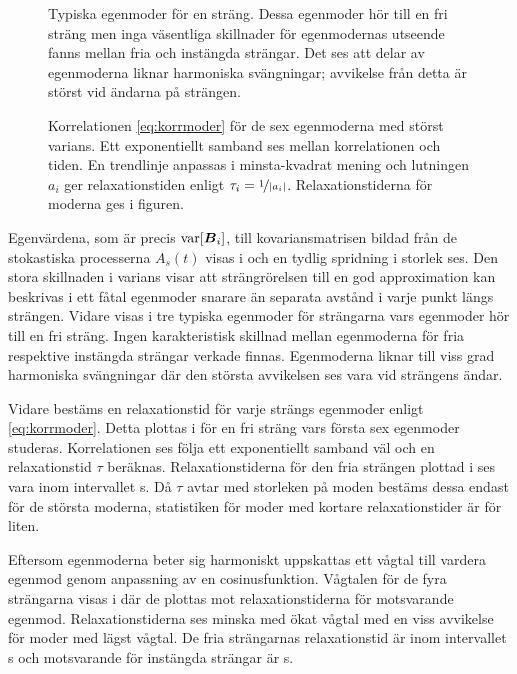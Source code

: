 \begin{figure}
    \centering
    
    \caption{Typiska egenmoder för en sträng. Dessa egenmoder hör till en fri sträng men inga väsentliga skillnader för egenmodernas utseende fanns mellan fria och instängda strängar. Det ses att delar av egenmoderna liknar harmoniska svängningar; avvikelse från detta är störst vid ändarna på strängen.}
    \label{fig:egenmoder}
\end{figure}

\begin{figure}
    \centering
    
    \caption{Korrelationen \eqref{eq:korrmoder} för de sex egenmoderna med störst varians. Ett exponentiellt samband ses mellan korrelationen och tiden. En trendlinje anpassas i minsta-kvadrat mening och lutningen $a_i$ ger relaxationstiden enligt $\tau_i=\nicefrac{1}{\abs{a_i}}$. Relaxationstiderna för moderna ges i figuren.}
    \label{fig:korrelation}
\end{figure}

Egenvärdena, som är precis $\text{var}\!\left[\boldsymbol{B}_i\right]$, till kovariansmatrisen bildad från de stokastiska processerna $A_s(t)$ visas i  och en tydlig spridning i storlek ses. Den stora skillnaden i varians visar att strängrörelsen till en god approximation kan beskrivas i ett fåtal egenmoder snarare än separata avstånd i varje punkt längs strängen. Vidare visas i  tre typiska egenmoder för strängarna vars egenmoder hör till en fri sträng. Ingen karakteristisk skillnad mellan egenmoderna för fria respektive instängda strängar verkade finnas. Egenmoderna liknar till viss grad harmoniska svängningar där den största avvikelsen ses vara vid strängens ändar.

Vidare bestäms en relaxationstid för varje strängs egenmoder enligt \eqref{eq:korrmoder}. Detta plottas i  för en fri sträng vars första sex egenmoder studeras. Korrelationen ses följa ett exponentiellt samband väl och en relaxationstid $\tau$ beräknas. Relaxationstiderna för den fria strängen plottad i  ses vara inom intervallet \unit[0,3--8,0]{s}. Då $\tau$ avtar med storleken på moden bestäms dessa endast för de största moderna, statistiken för moder med kortare relaxationstider är för liten. 

Eftersom egenmoderna beter sig harmoniskt uppskattas ett vågtal till vardera egenmod genom anpassning av en cosinusfunktion. Vågtalen för de fyra strängarna visas i  där de plottas mot relaxationstiderna för motsvarande egenmod. Relaxationstiderna ses minska med ökat vågtal med en viss avvikelse för moder med lägst vågtal. De fria strängarnas relaxationstid är inom intervallet \unit[0,1--10]{s} och motsvarande för instängda strängar är \unit[0,1--2]{s}.

